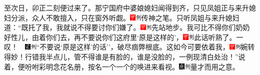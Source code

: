 至次日，卯正二刻便过来了。那宁国府中婆娘媳妇闻得到齐，只见凤姐正与来升媳妇分派，众人不敢擅入，只在窗外听觑。{\includegraphics[width=3mm]{../Images/00002}\includegraphics[width=3mm]{../Images/00011}\footnotesize \kaishu 传神之笔。}只听凤姐与来升媳妇道：``既托了我，我就说不得要讨你们嫌了。{\includegraphics[width=3mm]{../Images/00002}\includegraphics[width=3mm]{../Images/00011}\footnotesize \kaishu 先站地步。}我可比不得你们奶奶好性儿，由着你们去，再不要说你们这府里`原是这样的'，{{\includegraphics[width=3mm]{../Images/00002}\includegraphics[width=3mm]{../Images/00011}\footnotesize \kaishu 此话听熟了。一叹！　}\includegraphics[width=3mm]{../Images/00006}\includegraphics[width=3mm]{../Images/00011}\footnotesize \kaishu ``不要说`原是这样'的话''，破尽痼弊根底。}这如今可要依着我，{\includegraphics[width=3mm]{../Images/00002}\includegraphics[width=3mm]{../Images/00011}\footnotesize \kaishu 婉转得妙！}行错我半点儿，管不得谁是有脸的，谁是没脸的，一例现清白处治！''说着，便吩咐彩明念花名册，按名一个一个的唤进来看视。{\includegraphics[width=3mm]{../Images/00004}\includegraphics[width=3mm]{../Images/00011}\footnotesize \kaishu 量才而用之意。}

